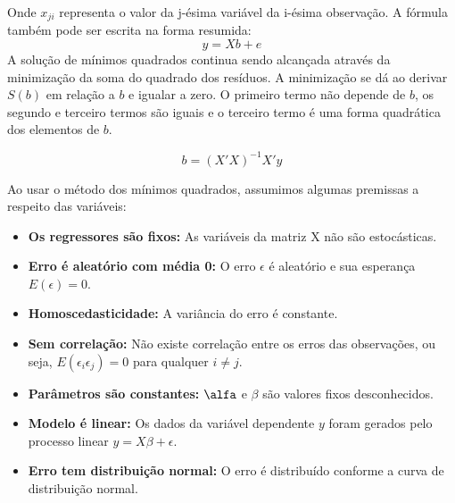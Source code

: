 Onde $x_{ji}$ representa o valor da j-ésima variável da i-ésima observação. A fórmula também pode ser escrita na forma resumida:
\begin{equation}
	y = Xb + e
\end{equation}
A solução de mínimos quadrados continua sendo alcançada através da minimização da soma do quadrado dos resíduos.
A minimização se dá ao derivar $S(b)$ em relação a $b$ e igualar a zero. O primeiro termo não depende de $b$, os segundo e terceiro termos são iguais e o terceiro termo é uma forma quadrática dos elementos de $b$.

\begin{equation}
	b=(X'X)^{-1}X'y
\end{equation}


Ao usar o método dos mínimos quadrados, assumimos algumas premissas a respeito das variáveis:
\begin{itemize}
	\item \textbf{Os regressores são fixos:} As variáveis da matriz X não são estocásticas.
	\item \textbf{Erro é aleatório com média 0:} O erro $\epsilon$ é aleatório e sua esperança $E(\epsilon)=0$.
	\item\textbf{Homoscedasticidade:} A variância do erro é constante.
	\item\textbf{Sem correlação:} Não existe correlação entre os erros das observações, ou seja, $E(\epsilon_i \epsilon_j)=0$ para qualquer $i\neq j$.
	\item \textbf{Parâmetros são constantes:} $\alfa$ e $\beta$ são valores fixos desconhecidos.
	\item \textbf{Modelo é linear:} Os dados da variável dependente $y$ foram gerados pelo processo linear $y=X\beta + \epsilon$.
	\item \textbf{Erro tem distribuição normal:} O erro é distribuído conforme a curva de distribuição normal.	
\end{itemize}


\newpage
